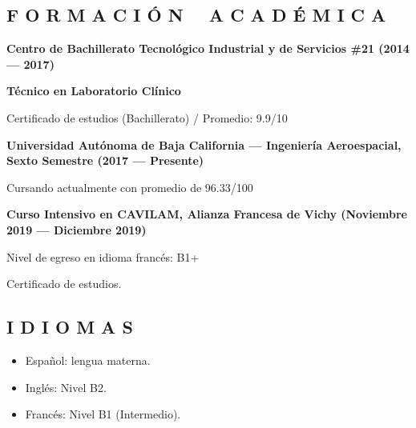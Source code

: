 \documentclass[12pt, letterpaper]{article}
\begin{document}
\begin{shaded}
	\vspace{-0.3cm}
\subsection*{\textcolor{title}{F O R M A C I Ó N \ \ A C A D É M I C A}}

	\textbf{\textcolor{subtitle}{Centro de Bachillerato Tecnológico Industrial y de Servicios \#21 (2014 --- 2017)}}
	
	\textbf{Técnico en Laboratorio Clínico}

	Certificado de estudios (Bachillerato) / Promedio: 9.9/10

	\noindent \textbf{\textcolor{subtitle}{Universidad Autónoma de Baja California --- Ingeniería Aeroespacial, Sexto Semestre (2017 --- Presente)}}

	Cursando actualmente con promedio de 96.33/100

	\noindent \textbf{\textcolor{subtitle}{Curso Intensivo en CAVILAM, Alianza Francesa de Vichy (Noviembre 2019 --- Diciembre 2019)}}

	Nivel de egreso en idioma francés: B1+

	Certificado de estudios.

\end{shaded}


\subsection*{\textcolor{title}{I D I O M A S}}

\begin{itemize}
	\item Español: lengua materna.
	\item Inglés: Nivel B2.
	\item Francés: Nivel B1 (Intermedio).
\end{itemize}
\end{document}
